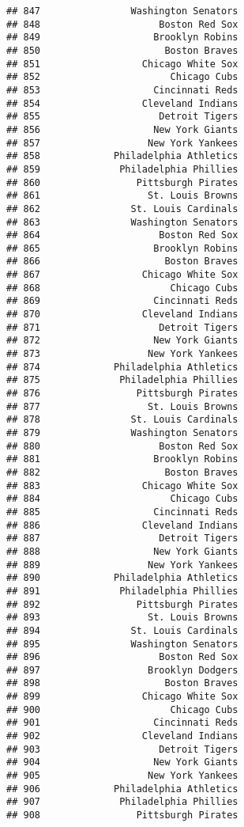 \documentclass[]{article}
\begin{document}
\begin{verbatim}
## 847                Washington Senators
## 848                     Boston Red Sox
## 849                    Brooklyn Robins
## 850                      Boston Braves
## 851                  Chicago White Sox
## 852                       Chicago Cubs
## 853                    Cincinnati Reds
## 854                  Cleveland Indians
## 855                     Detroit Tigers
## 856                    New York Giants
## 857                   New York Yankees
## 858             Philadelphia Athletics
## 859              Philadelphia Phillies
## 860                 Pittsburgh Pirates
## 861                   St. Louis Browns
## 862                St. Louis Cardinals
## 863                Washington Senators
## 864                     Boston Red Sox
## 865                    Brooklyn Robins
## 866                      Boston Braves
## 867                  Chicago White Sox
## 868                       Chicago Cubs
## 869                    Cincinnati Reds
## 870                  Cleveland Indians
## 871                     Detroit Tigers
## 872                    New York Giants
## 873                   New York Yankees
## 874             Philadelphia Athletics
## 875              Philadelphia Phillies
## 876                 Pittsburgh Pirates
## 877                   St. Louis Browns
## 878                St. Louis Cardinals
## 879                Washington Senators
## 880                     Boston Red Sox
## 881                    Brooklyn Robins
## 882                      Boston Braves
## 883                  Chicago White Sox
## 884                       Chicago Cubs
## 885                    Cincinnati Reds
## 886                  Cleveland Indians
## 887                     Detroit Tigers
## 888                    New York Giants
## 889                   New York Yankees
## 890             Philadelphia Athletics
## 891              Philadelphia Phillies
## 892                 Pittsburgh Pirates
## 893                   St. Louis Browns
## 894                St. Louis Cardinals
## 895                Washington Senators
## 896                     Boston Red Sox
## 897                   Brooklyn Dodgers
## 898                      Boston Braves
## 899                  Chicago White Sox
## 900                       Chicago Cubs
## 901                    Cincinnati Reds
## 902                  Cleveland Indians
## 903                     Detroit Tigers
## 904                    New York Giants
## 905                   New York Yankees
## 906             Philadelphia Athletics
## 907              Philadelphia Phillies
## 908                 Pittsburgh Pirates

\end{verbatim}
\end{document}
